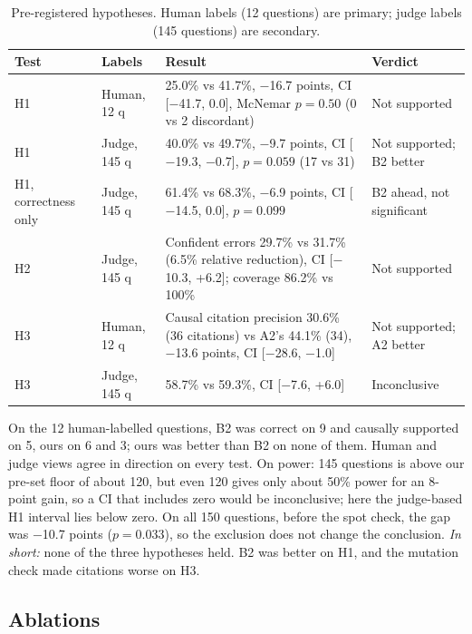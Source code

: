 \documentclass[10pt,a4paper]{article}
\newcommand{\m}{$-$}
\begin{document}
\begin{table}[!htb]
\centering\footnotesize
\caption{Pre-registered hypotheses. Human labels (12 questions) are primary; judge labels (145 questions) are secondary.}
\begin{tabularx}{\linewidth}{@{}l l Y l@{}}
\toprule
Test & Labels & Result & Verdict\\
\midrule
H1 & Human, 12 q & 25.0\% vs 41.7\%, \m16.7 points, CI [\m41.7, 0.0], McNemar $p=0.50$ (0 vs 2 discordant) & Not supported\\
H1 & Judge, 145 q & 40.0\% vs 49.7\%, \m9.7 points, CI [\m19.3, \m0.7], $p=0.059$ (17 vs 31) & Not supported; B2 better\\
H1, correctness only & Judge, 145 q & 61.4\% vs 68.3\%, \m6.9 points, CI [\m14.5, 0.0], $p=0.099$ & B2 ahead, not significant\\
H2 & Judge, 145 q & Confident errors 29.7\% vs 31.7\% (6.5\% relative reduction), CI [\m10.3, +6.2]; coverage 86.2\% vs 100\% & Not supported\\
H3 & Human, 12 q & Causal citation precision 30.6\% (36 citations) vs A2's 44.1\% (34), \m13.6 points, CI [\m28.6, \m1.0] & Not supported; A2 better\\
H3 & Judge, 145 q & 58.7\% vs 59.3\%, CI [\m7.6, +6.0] & Inconclusive\\
\bottomrule
\end{tabularx}
\end{table}

On the 12 human-labelled questions, B2 was correct on 9 and causally supported on 5, ours on 6 and 3; ours was better
than B2 on none of them. Human and judge views agree in direction on every test. On power: 145 questions is above our
pre-set floor of about 120, but even 120 gives only about 50\% power for an 8-point gain, so a CI that includes zero
would be inconclusive; here the judge-based H1 interval lies below zero. On all 150 questions, before the spot check,
the gap was \m10.7 points ($p=0.033$), so the exclusion does not change the conclusion.
\emph{In short:} none of the three hypotheses held. B2 was better on H1, and the mutation check made citations worse
on H3.

\subsection{Ablations}
\end{document}
